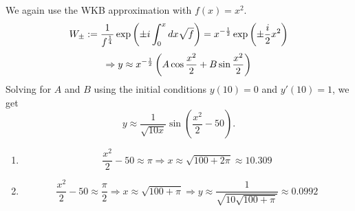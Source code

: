\item
We again use the WKB approximation with $f(x) = x^2$.
\[
	W_\pm
	:= \frac{1}{f^{\frac{1}{4}}} \exp\left( \pm i \int_0^x dx \sqrt{f} \right)
	= x^{-\frac{1}{2}} \exp\left( \pm \frac{i}{2}x^2 \right)
\]
\[
	\Rightarrow y \approx x^{-\frac{1}{2}} \left( A \cos \frac{x^2}{2} + B \sin \frac{x^2}{2} \right)
\]
Solving for $A$ and $B$ using the initial conditions $y(10) = 0$ and $y'(10) = 1$, we get
\[
	y \approx \frac{1}{\sqrt{10x}} \sin\left( \frac{x^2}{2} - 50 \right).
\]

\begin{enumerate}[wide, labelindent = 0pt, label = (\alph*)]
	\item
	      \[
		      \frac{x^2}{2} - 50 \approx \pi
		      \Rightarrow x \approx \sqrt{100 + 2\pi} \approx 10.309
	      \]
	\item
	      \[
		      \frac{x^2}{2} - 50 \approx \frac{\pi}{2}
		      \Rightarrow x \approx \sqrt{100 + \pi}
		      \Rightarrow y \approx \frac{1}{\sqrt{10 \sqrt{100 + \pi}}} \approx 0.0992
	      \]

\end{enumerate}